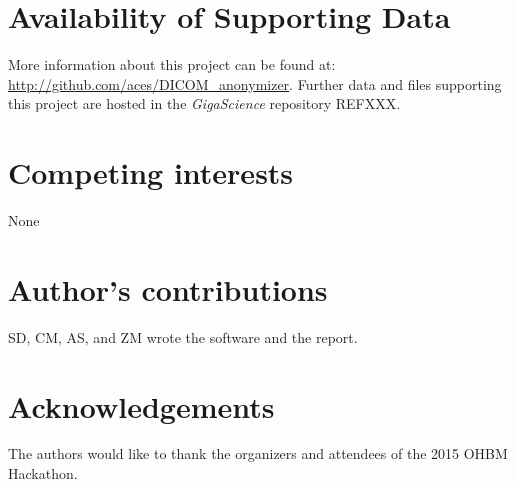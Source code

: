 \documentclass[twocolumn]{bmcart}%
\begin{document}
\begin{backmatter}

\section*{Availability of Supporting Data}
More information about this project can be found at: \url{http://github.com/aces/DICOM\_anonymizer}. Further data and files supporting this project are hosted in the \emph{GigaScience} repository REFXXX.

\section*{Competing interests}
None

\section*{Author's contributions}
SD, CM, AS, and ZM wrote the software and the report.

\section*{Acknowledgements}
The authors would like to thank the organizers and attendees of the 2015
OHBM Hackathon.

  
  


\end{backmatter}
\end{document}
